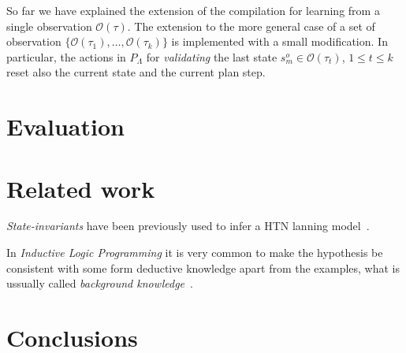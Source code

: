 \documentclass{article}
\begin{document}
So far we have explained the extension of the compilation for learning from a single observation $\mathcal{O}(\tau)$. The extension to the more general case of a set of observation $\{\mathcal{O}(\tau_1),\ldots,\mathcal{O}(\tau_k)\}$ is implemented with a small modification. In particular, the actions in $P_{\Lambda}$ for {\em validating} the last state $s_m^o\in \mathcal{O}(\tau_t)$, {\tt\small $1\leq t\leq k$} reset also the current state and the current plan step. 



\section{Evaluation}
\label{sec:evaluation}

\section{Related work}
\label{sec:related}
{\em State-invariants} have been previously used to infer a HTN lanning model~\cite{lotinac2016constructing}.

In {\em Inductive Logic Programming} it is very common to make the hypothesis be consistent with some form deductive knowledge apart from the examples, what is ussually called {\em background knowledge}~\cite{muggleton1994inductive}.



\section{Conclusions}
\label{sec:conclusions}




\end{document}
